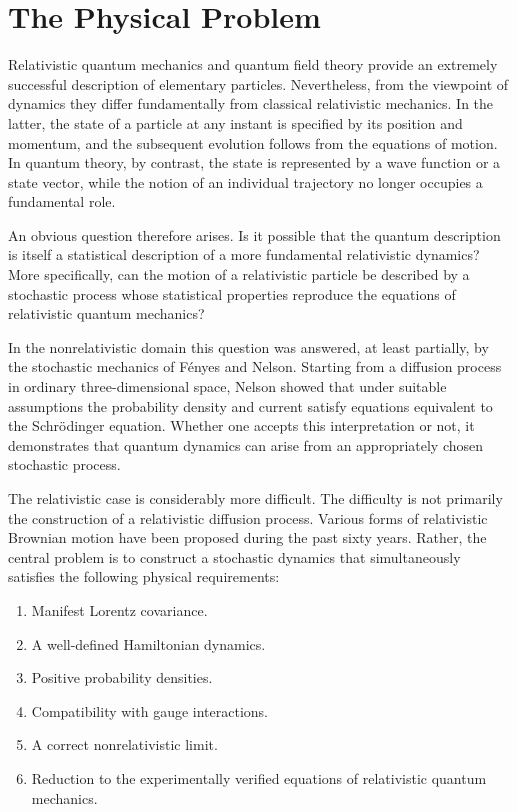 \section{The Physical Problem}

Relativistic quantum mechanics and quantum field theory provide an extremely
successful description of elementary particles. Nevertheless, from the
viewpoint of dynamics they differ fundamentally from classical relativistic
mechanics. In the latter, the state of a particle at any instant is specified
by its position and momentum, and the subsequent evolution follows from the
equations of motion. In quantum theory, by contrast, the state is represented
by a wave function or a state vector, while the notion of an individual
trajectory no longer occupies a fundamental role.

An obvious question therefore arises. Is it possible that the quantum
description is itself a statistical description of a more fundamental
relativistic dynamics? More specifically, can the motion of a relativistic
particle be described by a stochastic process whose statistical properties
reproduce the equations of relativistic quantum mechanics?

In the nonrelativistic domain this question was answered, at least partially,
by the stochastic mechanics of Fényes and Nelson. Starting from a diffusion
process in ordinary three-dimensional space, Nelson showed that under suitable
assumptions the probability density and current satisfy equations equivalent
to the Schrödinger equation. Whether one accepts this interpretation or not,
it demonstrates that quantum dynamics can arise from an appropriately chosen
stochastic process.

The relativistic case is considerably more difficult. The difficulty is not
primarily the construction of a relativistic diffusion process. Various forms
of relativistic Brownian motion have been proposed during the past sixty
years. Rather, the central problem is to construct a stochastic dynamics that
simultaneously satisfies the following physical requirements:

\begin{enumerate}

\item
Manifest Lorentz covariance.

\item
A well-defined Hamiltonian dynamics.

\item
Positive probability densities.

\item
Compatibility with gauge interactions.

\item
A correct nonrelativistic limit.

\item
Reduction to the experimentally verified equations of relativistic quantum
mechanics.

\end{enumerate}

